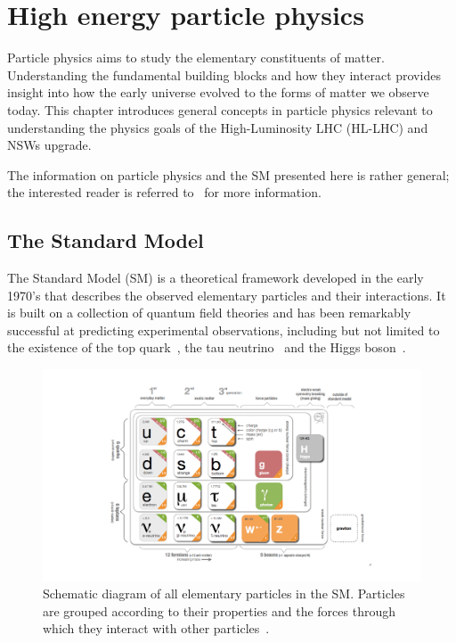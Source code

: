 
\chapter{High energy particle physics}
\label{chap:hep}

Particle physics aims to study the elementary constituents of matter. Understanding the fundamental building blocks and how they interact provides insight into how the early universe evolved to the forms of matter we observe today. This chapter introduces general concepts in particle physics relevant to understanding the physics goals of the High-Luminosity LHC (HL-LHC) and NSWs upgrade. 

The information on particle physics and the SM presented here is rather general; the interested reader is referred to~\cite{griffiths_introduction_2011, peskin_introduction_1995, zyla_review_2020} for more information. 

\section{The Standard Model}

The Standard Model (SM) is a theoretical framework developed in the early 1970's that describes the observed elementary particles and their interactions.  It is built on a collection of quantum field theories and has been remarkably successful at predicting experimental observations, including but not limited to the existence of the top quark~\cite{kobayashi_cp-violation_1973}, the tau neutrino~\cite{perl_evidence_1975} and the Higgs boson~\cite{englert_broken_1964, higgs_broken_1964}. 

\begin{figure}[t]
    \centering
    \includegraphics[width = \textwidth]{figures/standardmodel_galbraith_carsten.pdf}
    \caption{Schematic diagram of all elementary particles in the SM.  Particles are grouped according to their properties and the forces through which they interact with other particles~\cite{galbraith_ux_2013}.}
    \label{fig:standard_model}
\end{figure}

